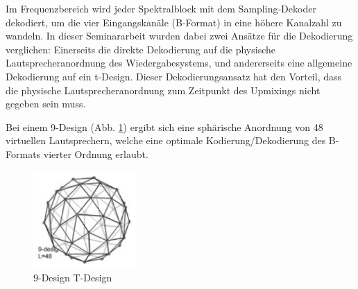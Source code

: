 


Im Frequenzbereich wird jeder Spektralblock mit dem Sampling-Dekoder dekodiert, um die vier Eingangskanäle (B-Format) in eine höhere Kanalzahl zu wandeln.
In dieser Seminararbeit wurden dabei zwei Ansätze für die Dekodierung verglichen: Einerseits die direkte Dekodierung auf die physische Lautsprecheranordnung des Wiedergabesystems, und andererseits eine allgemeine Dekodierung auf ein t-Design. Dieser Dekodierungsansatz hat den Vorteil, dass die physische Lautsprecheranordnung zum Zeitpunkt des Upmixings nicht gegeben sein muss.

Bei einem 9-Design (Abb. \ref{fig:tdesign_image}) ergibt sich eine sphärische Anordnung von 48 virtuellen Lautsprechern, welche eine optimale Kodierung/Dekodierung des B-Formats vierter Ordnung erlaubt.

\begin{figure}[!ht]
  \centering
  \includegraphics[width=0.35\textwidth]{implementierung/plots/t-design.png}
  \caption{9-Design T-Design \cite{ambi-book}}
  \label{fig:tdesign_image}
\end{figure}

